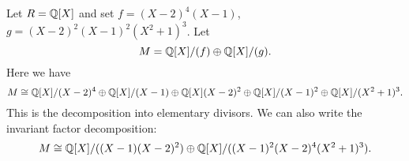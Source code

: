 \begin{example}
  Let $R = \mathbb{Q}[X]$ and set $f = (X - 2)^4(X - 1)$,
  $g = (X - 2)^2 (X - 1)^2 (X^2 + 1)^3$. Let
  \[
    M = \mathbb{Q}[X] / (f) \oplus \mathbb{Q}[X] / (g).
  \]
  Here we have
  \[
    M \cong \mathbb{Q}[X] / (X - 2)^4 \oplus \mathbb{Q}[X] / (X - 1)
    \oplus \mathbb{Q}[X] (X - 2)^2 \oplus \mathbb{Q}[X] / (X - 1)^2
    \oplus \mathbb{Q}[X] / (X^2 + 1)^3.
  \]
  This is the decomposition into elementary divisors.
  We can also write the invariant factor decomposition:
  \[
  M \cong \mathbb{Q}[X] / ((X - 1)(X - 2)^2) \oplus \mathbb{Q}[X] / ((X - 1)^2(X - 2)^4 (X^2 + 1)^3).
  \]
\end{example}
